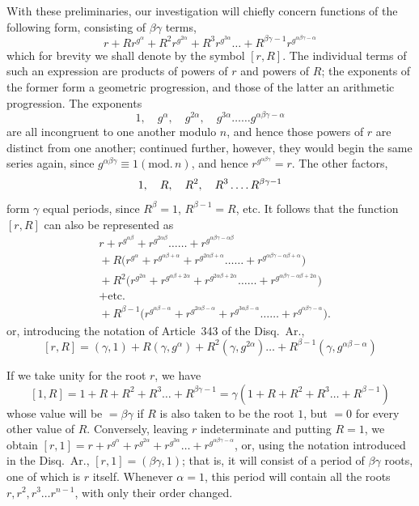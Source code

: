 With these preliminaries, our investigation will chiefly concern functions of the following form, consisting of $\beta\gamma$ terms,
\[
r+Rr^{g^\alpha}+R^2r^{g^{2\alpha}}+R^3r^{g^{3\alpha}}\ldots+R^{\beta\gamma-1}r^{g^{\alpha\beta\gamma-\alpha}}
\]
which for brevity we shall denote by the symbol $[r,R]$. The individual terms of such an expression are products of powers of $r$ and powers of $R$; the exponents of the former form a geometric progression, and those of the latter an arithmetic progression. The exponents
\[
1,\quad g^\alpha,\quad g^{2\alpha},\quad g^{3\alpha}\ldots\ldots g^{\alpha\beta\gamma-\alpha}
\]
are all incongruent to one another modulo $n$, and hence those powers of $r$ are distinct from one another; continued further, however, they would begin the same series again, since $g^{\alpha\beta\gamma}\equiv1(\mathrm{mod.}\,n)$, and hence $r^{g^{\alpha\beta\gamma}}=r$. The other factors,
\[
1,\quad R,\quad R^2,\quad R^3\mathinner{.\,.\,.\,.} R^{\beta\gamma-1}
\]
form $\gamma$ equal periods, since $R^\beta=1$, $R^{\beta-1}=R$, etc. It follows that the function $[r,R]$ can also be represented as
\[
\begin{aligned}
&r+r^{g^{\alpha\beta}}+r^{g^{2\alpha\beta}}\ldots\ldots+r^{g^{\alpha\beta\gamma-\alpha\beta}}\\
&{}+R\bigl(r^{g^\alpha}+r^{g^{\alpha\beta+\alpha}}+r^{g^{2\alpha\beta+\alpha}}\ldots\ldots+r^{g^{\alpha\beta\gamma-\alpha\beta+\alpha}}\bigr)\\
&{}+R^2\bigl(r^{g^{2\alpha}}+r^{g^{\alpha\beta+2\alpha}}+r^{g^{2\alpha\beta+2\alpha}}\ldots\ldots+r^{g^{\alpha\beta\gamma-\alpha\beta+2\alpha}}\bigr)\\
&{}+\text{etc.}\\
&{}+R^{\beta-1}\bigl(r^{g^{\alpha\beta-\alpha}}+r^{g^{2\alpha\beta-\alpha}}+r^{g^{3\alpha\beta-\alpha}}\ldots\ldots+r^{g^{\alpha\beta\gamma-\alpha}}\bigr).
\end{aligned}
\]
or, introducing the notation of Article~343 of the Disq.\ Ar.,
\[
[r,R]=(\gamma,1)+R(\gamma,g^\alpha)+R^2(\gamma,g^{2\alpha})\ldots+R^{\beta-1}(\gamma,g^{\alpha\beta-\alpha})
\]

If we take unity for the root $r$, we have
\[
[1,R]=1+R+R^2+R^3\ldots+R^{\beta\gamma-1}=\gamma(1+R+R^2+R^3\ldots+R^{\beta-1})
\]
whose value will be $=\beta\gamma$ if $R$ is also taken to be the root $1$, but $=0$ for every other value of $R$. Conversely, leaving $r$ indeterminate and putting $R=1$, we obtain $[r,1]=r+r^{g^\alpha}+r^{g^{2\alpha}}+r^{g^{3\alpha}}\ldots+r^{g^{\alpha\beta\gamma-\alpha}}$, or, using the notation introduced in the Disq.\ Ar., $[r,1]=(\beta\gamma,1)$; that is, it will consist of a period of $\beta\gamma$ roots, one of which is $r$ itself. Whenever $\alpha=1$, this period will contain all the roots $r,r^2,r^3\ldots r^{n-1}$, with only their order changed.

